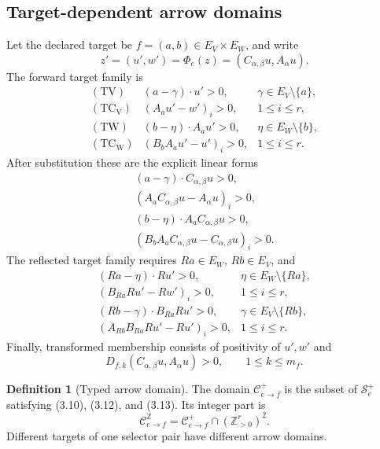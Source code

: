 \documentclass[11pt]{article}
\theoremstyle{definition}
\newtheorem{definition}[theorem]{Definition}
\theoremstyle{remark}
\begin{document}
\subsection{Target-dependent arrow domains}

Let the declared target be
\(f=(a,b)\in E_V\times E_W\), and write
\[
 z'=(u',w')=\Phi_e(z)
 =(C_{\alpha,\beta}u,A_\alpha u).
\]
The forward target family is
\[
\begin{array}{rll}
\mathrm{(TV)}&(a-\gamma)\cdot u'>0,
 &\gamma\in E_V\setminus\{a\},\\
\mathrm{(TC_V)}&(A_a u'-w')_i>0,&1\leq i\leq r,\\
\mathrm{(TW)}&(b-\eta)\cdot A_a u'>0,
 &\eta\in E_W\setminus\{b\},\\
\mathrm{(TC_W)}&(B_bA_a u'-u')_i>0,&1\leq i\leq r .
\end{array}
\tag{3.10}
\]
After substitution these are the explicit linear forms
\[
\begin{array}{l}
(a-\gamma)\cdot C_{\alpha,\beta}u>0,\\
(A_aC_{\alpha,\beta}u-A_\alpha u)_i>0,\\
(b-\eta)\cdot A_aC_{\alpha,\beta}u>0,\\
(B_bA_aC_{\alpha,\beta}u-C_{\alpha,\beta}u)_i>0.
\end{array}
\tag{3.11}
\]
The reflected target family requires \(Ra\in E_W\), \(Rb\in E_V\), and
\[
\begin{array}{rll}
(Ra-\eta)\cdot Ru'>0,&\eta\in E_W\setminus\{Ra\},\\
(B_{Ra}Ru'-Rw')_i>0,&1\leq i\leq r,\\
(Rb-\gamma)\cdot B_{Ra}Ru'>0,
 &\gamma\in E_V\setminus\{Rb\},\\
(A_{Rb}B_{Ra}Ru'-Ru')_i>0,&1\leq i\leq r .
\end{array}
\tag{3.12}
\]
Finally, transformed membership consists of positivity of \(u',w'\) and
\[
 D_{f,k}(C_{\alpha,\beta}u,A_\alpha u)>0,
 \qquad 1\leq k\leq m_f.
\tag{3.13}
\]

\begin{definition}[Typed arrow domain]
The domain \(\mathcal C_{e\to f}^+\) is the subset of
\(\mathcal S_e^+\) satisfying (3.10), (3.12), and (3.13).  Its integer
part is
\[
 \mathcal C_{e\to f}^{\mathbb Z}
 =\mathcal C_{e\to f}^{+}\cap(\mathbb Z_{>0}^{r})^2 .
\]
Different targets of one selector pair have different arrow domains.
\end{definition}
\end{document}
